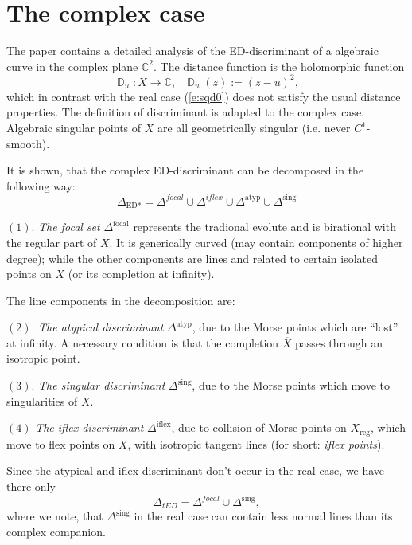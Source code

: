 \documentclass[12pt,a4,twoside]{amsart}
\DeclareMathOperator{\sq}{\mathbb{D}}
\DeclareMathOperator{\reg}{reg}
\DeclareMathOperator{\sing}{sing}
\DeclareMathOperator{\atyp}{atyp}
\DeclareMathOperator{\iflex}{iflex}
\DeclareMathOperator{\focal}{focal}
\DeclareMathOperator{\ED}{ED}
\DeclareMathOperator{\tED}{\ED*}
\newtheorem*{main lemma}{The main lemma}
\begin{document}
\section{The complex case}

The paper \cite{JST} contains a detailed analysis of the ED-discriminant of a algebraic curve in the complex plane $\mathbb{C}^2$.
The  distance function is the holomorphic function 
\begin{equation}\label{e:sqdc}
\sq_u:X\rightarrow \mathbb{C}, \ \ \  \sq_u(z):=(z-u)^2,
\end{equation}
which in contrast with the real case  (\ref{e:sqd0}) does not satisfy the usual distance properties. The definition of discriminant is adapted to the complex case. Algebraic singular points of $X$ are all geometrically singular (i.e. never $C^1$-smooth).

It is shown, that the complex ED-discriminant can be decomposed in the following way:
  $$ \Delta_{\tED} = \Delta^{focal} \cup \Delta^{iflex}  \cup \Delta^{\atyp} \cup \Delta^{\sing}  $$
  
  $(1).$    \emph{The focal set} $\Delta^{\focal}$ represents the tradional evolute and is birational with the regular part of $X$. It is generically curved (may contain components of higher degree); while the other components are lines and related to certain isolated points on $X$ (or its completion  at infinity).

 
 The line components in the decomposition are:
 
 $(2).$  \emph{The atypical discriminant} $\Delta^{\atyp}$, due to the Morse points which are ``lost'' at infinity. A necessary condition is that  the completion $\overline{X}$ passes through an isotropic point.

 $(3).$  \emph{The singular  discriminant} $\Delta^{\sing}$, due to the Morse points which move to singularities of $X$. 
 
  $(4)$ \emph{The iflex discriminant } $\Delta^{\iflex}$, due to collision of Morse points on $X_{\reg}$, which move to flex points on $X$, with isotropic tangent lines (for short:\emph{ iflex points}). 
  
  Since the atypical and iflex discriminant don't occur in the real case, we have there only
   $$ \Delta_{tED} = \Delta^{focal} \cup   \Delta^{\sing},  $$
 where we note, that  $\Delta^{\sing}$ in the real case can contain less normal lines than its complex companion.
\end{document}
